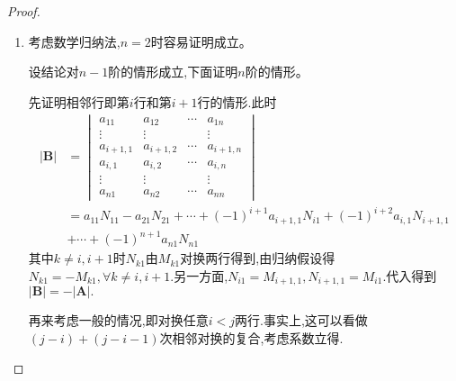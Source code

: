 {\begin{proof}
\begin{enumerate}[label = {\textup{(\arabic*)}}]
            \item 考虑数学归纳法,$n=2$时容易证明成立。

                  设结论对$n-1$阶的情形成立,下面证明$n$阶的情形。

                  先证明相邻行即第$i$行和第$i+1$行的情形.此时
                  \begin{align*}
                      \left|\bm{B}\right| & =\begin{vmatrix}
                                                 a_{11}    & a_{12}    & \cdots & a_{1n}    \\
                                                 \vdots    & \vdots    &        & \vdots    \\
                                                 a_{i+1,1} & a_{i+1,2} & \cdots & a_{i+1,n} \\
                                                 a_{i,1}   & a_{i,2}   & \cdots & a_{i,n}   \\
                                                 \vdots    & \vdots    &        & \vdots    \\
                                                 a_{n1}    & a_{n2}    & \cdots & a_{nn}
                                             \end{vmatrix}                                            \\
                                          & =a_{11}N_{11}-a_{21}N_{21}+\cdots+(-1)^{i+1}a_{i+1,1}N_{i1}+(-1)^{i+2}a_{i,1}N_{i+1,1} \\
                                          & +\cdots+(-1)^{n+1}a_{n1}N_{n1}
                  \end{align*}
                  其中$k\neq i,i+1$时$N_{k1}$由$M_{k1}$对换两行得到,由归纳假设得$N_{k1}=-M_{k1},\forall k\neq i,i+1.$另一方面,$N_{i1}=M_{i+1,1},N_{i+1,1}=M_{i1}.$代入得到$\left|\bm{B}\right|=-\left|\bm{A}\right|.$

                  再来考虑一般的情况,即对换任意$i<j$两行.事实上,这可以看做$\left(j-i\right)+\left(j-i-1\right)$次相邻对换的复合,考虑系数立得.


\end{enumerate}
\end{proof}}

